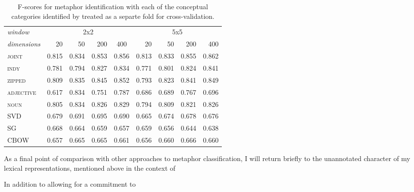 \begin{table}
\centering
\begin{tabular}{lrrrr|rrrr}
\hline
\emph{window} & \multicolumn{4}{c}{2x2} & \multicolumn{4}{c}{5x5} \\
\emph{dimensions} & 20 & 50 & 200 & \multicolumn{1}{c}{400} & 20 & 50 & 200 & 400 \\
\hline
\textsc{joint} & 0.815 & 0.834 & 0.853 & 0.856 & 0.813 & 0.833 & 0.855 & 0.862 \\
\textsc{indy} & 0.781 & 0.794 & 0.827 & 0.834 & 0.771 & 0.801 & 0.824 & 0.841 \\
\textsc{zipped} & 0.809 & 0.835 & 0.845 & 0.852 & 0.793 & 0.823 & 0.841 & 0.849 \\
\textsc{adjective} & 0.617 & 0.834 & 0.751 & 0.787 & 0.686 & 0.689 & 0.767 & 0.696\\
\textsc{noun} & 0.805 & 0.834 & 0.826 & 0.829 & 0.794 & 0.809 & 0.821 & 0.826 \\
\textsc{SVD} & 0.679 & 0.691 & 0.695 & 0.690 & 0.665 & 0.674 & 0.678 & 0.676 \\
\textsc{SG} & 0.668 & 0.664 & 0.659 & 0.657 & 0.659 & 0.656 & 0.644 & 0.638 \\
\textsc{CBOW} & 0.657 & 0.665 & 0.665 & 0.661 & 0.656 & 0.660 & 0.666 & 0.660 \\
\hline
\end{tabular}
\caption{F-scores for metaphor identification with each of the conceptual categories identified by \cite{GutierrezEA2016} treated as a separte fold for cross-validation.}
\label{tab:related}
\end{table}

As a final point of comparison with other approaches to metaphor classification, I will return briefly to the unannotated character of my lexical representations, mentioned above in the context of

In addition to allowing for a commitment to 

